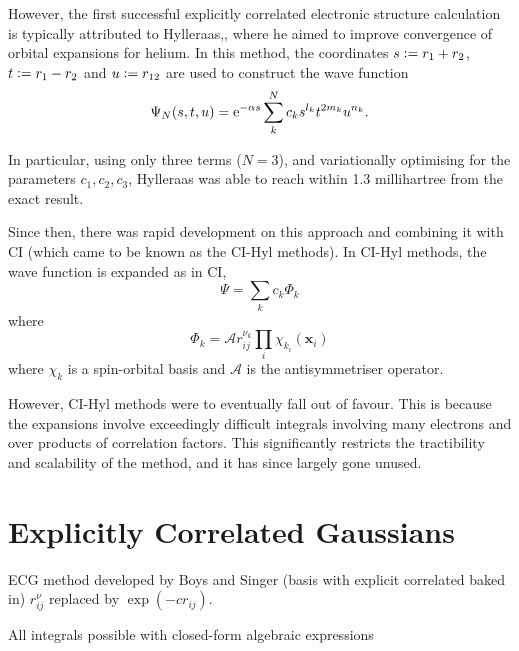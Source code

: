 However, the first successful explicitly correlated electronic structure calculation is typically attributed to Hylleraas,\cite{hattigExplicitly2012}, where he aimed to improve convergence of orbital expansions for helium.\cite{hylleraasUeber1928,hylleraasNeueBerechnungEnergie1929} In this method, the coordinates $s\mathrel{\mathop:}= r_1+r_2$, $t\mathrel{\mathop:}= r_1 - r_2$ and $u\mathrel{\mathop:}= r_{12}$ are used to construct the wave function
\begin{equation}
    \Psi_N(s,t,u) = \mathrm{e}^{-\alpha s}\sum_{k}^N c_ks^{l_k}t^{2m_k}u^{n_k}.
\end{equation}

In particular, using only three terms ($N=3$), and variationally optimising for the parameters $c_1,c_2,c_3$, Hylleraas was able to reach within 1.3 millihartree from the exact result.

Since then, there was rapid development on this approach and combining it with \gls{CI} (which came to be known as the CI-Hyl methods).
\cite{largo-cabrerizoHylleraasCI1987,jamesGround1933,kolosAccurate1964,perkinsAtomic1968,perkinsAtomic1969,simsCombined1971,simsOneCenter1971,claryHylleraastype1977,claryCIHylleraas1976} In CI-Hyl methods, the wave function is expanded as in \gls{CI},
\begin{equation}
    \Psi = \sum_k c_k \Phi_k
\end{equation}
where
\begin{equation}
    \Phi_k = \mathcal{A} r^{\nu_k}_{ij}\prod_i\chi_{k_i}(\bm x_i)
\end{equation}
where ${\chi_k}$ is a spin-orbital basis and $\mathcal{A}$ is the antisymmetriser operator.

However, CI-Hyl methods were to eventually fall out of favour. This is because the expansions involve exceedingly difficult integrals involving many electrons and over products of correlation factors. This significantly restricts the tractibility and scalability of the method, and it has since largely gone unused.

\section{Explicitly Correlated Gaussians}

\gls{ECG} method developed by Boys and Singer\cite{boysIntegral1960,singerUse1960} (basis with explicit correlated baked in) $r_{ij}^\nu$ replaced by $\exp(-cr_{ij})$.

All integrals possible with closed-form algebraic expressions\cite{lesterGaussian1964}

